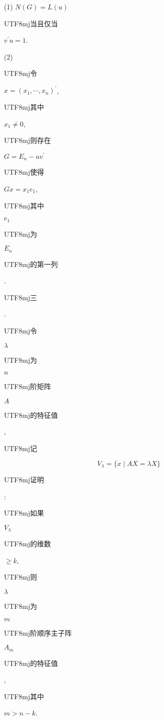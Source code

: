 \documentclass[10pt]{article}
\begin{document}
(1) $N(G)=L(u)$ \begin{CJK}{UTF8}{mj}当且仅当\end{CJK} $v^{\prime} u=1$.

(2) \begin{CJK}{UTF8}{mj}令\end{CJK} $x=\left(x_{1}, \cdots, x_{n}\right)^{\prime}$, \begin{CJK}{UTF8}{mj}其中\end{CJK} $x_{1} \neq 0$, \begin{CJK}{UTF8}{mj}则存在\end{CJK} $G=E_{n}-u v^{\prime}$ \begin{CJK}{UTF8}{mj}使得\end{CJK} $G x=x_{1} e_{1}$, \begin{CJK}{UTF8}{mj}其中\end{CJK} $e_{1}$ \begin{CJK}{UTF8}{mj}为\end{CJK} $E_{n}$ \begin{CJK}{UTF8}{mj}的第一列\end{CJK}.

\begin{CJK}{UTF8}{mj}三\end{CJK}. \begin{CJK}{UTF8}{mj}令\end{CJK} $\lambda$ \begin{CJK}{UTF8}{mj}为\end{CJK} $n$ \begin{CJK}{UTF8}{mj}阶矩阵\end{CJK} $A$ \begin{CJK}{UTF8}{mj}的特征值\end{CJK}, \begin{CJK}{UTF8}{mj}记\end{CJK}
$$
V_{\lambda}=\{x \mid A X=\lambda X\}
$$
\begin{CJK}{UTF8}{mj}证明\end{CJK}: \begin{CJK}{UTF8}{mj}如果\end{CJK} $V_{\lambda}$ \begin{CJK}{UTF8}{mj}的维数\end{CJK} $\geqslant k$, \begin{CJK}{UTF8}{mj}则\end{CJK} $\lambda$ \begin{CJK}{UTF8}{mj}为\end{CJK} $m$ \begin{CJK}{UTF8}{mj}阶顺序主子阵\end{CJK} $A_{m}$ \begin{CJK}{UTF8}{mj}的特征值\end{CJK}, \begin{CJK}{UTF8}{mj}其中\end{CJK} $m>n-k$.
\end{document}
